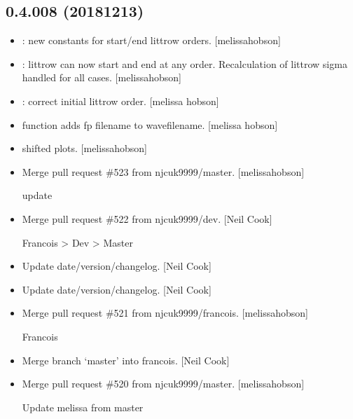 \documentclass[a4paper,10pt,english]{report}
\begin{document}
\subsection{0.4.008 (2018\sphinxhyphen{}12\sphinxhyphen{}13)}
\label{\detokenize{misc/changelog:id254}}\begin{itemize}
\item {} 
: new constants for start/end littrow orders.
{[}melissa\sphinxhyphen{}hobson{]}

\item {} 
: littrow can now start and end at any order.
Recalculation of littrow sigma handled for all cases. {[}melissa\sphinxhyphen{}hobson{]}

\item {} 
: correct initial littrow order. {[}melissa\sphinxhyphen{}
hobson{]}

\item {} 
 function adds fp filename to wavefilename. {[}melissa\sphinxhyphen{}
hobson{]}

\item {} 
 shifted plots. {[}melissa\sphinxhyphen{}hobson{]}

\item {} 
Merge pull request \#523 from njcuk9999/master. {[}melissa\sphinxhyphen{}hobson{]}

update

\item {} 
Merge pull request \#522 from njcuk9999/dev. {[}Neil Cook{]}

Francois \textendash{}\textgreater{} Dev \textendash{}\textgreater{} Master

\item {} 
Update date/version/changelog. {[}Neil Cook{]}

\item {} 
Update date/version/changelog. {[}Neil Cook{]}

\item {} 
Merge pull request \#521 from njcuk9999/francois. {[}melissa\sphinxhyphen{}hobson{]}

Francois

\item {} 
Merge branch ‘master’ into francois. {[}Neil Cook{]}

\item {} 
Merge pull request \#520 from njcuk9999/master. {[}melissa\sphinxhyphen{}hobson{]}

Update melissa from master

\end{itemize}
\end{document}
